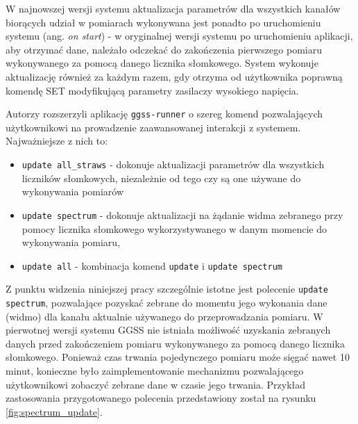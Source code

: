 W najnowszej wersji systemu aktualizacja parametrów dla wszystkich kanałów biorących udział w pomiarach wykonywana jest ponadto po uruchomieniu systemu (ang. \emph{on start}) - w oryginalnej wersji systemu po uruchomieniu aplikacji, aby otrzymać dane, należało odczekać do zakończenia pierwszego pomiaru wykonywanego za pomocą danego licznika słomkowego. System wykonuje aktualizację również za każdym razem, gdy otrzyma od użytkownika poprawną komendę SET modyfikującą parametry zasilaczy wysokiego napięcia.

Autorzy rozszerzyli aplikację \lstinline{ggss-runner} o szereg komend pozwalających użytkownikowi na prowadzenie zaawansowanej interakcji z systemem. Najważniejsze z nich to:
\begin{itemize}
\item \lstinline{update all_straws} - dokonuje aktualizacji parametrów dla wszystkich liczników słomkowych, niezależnie od tego czy są one używane do wykonywania pomiarów
\item \lstinline{update spectrum} - dokonuje aktualizacji na żądanie widma zebranego przy pomocy licznika słomkowego wykorzystywanego w danym momencie do wykonywania pomiaru, 
\item \lstinline{update all} - kombinacja komend \lstinline{update} i \lstinline{update spectrum}
\end{itemize}

Z punktu widzenia niniejszej pracy szczególnie istotne jest polecenie \lstinline{update spectrum}, pozwalające pozyskać zebrane do momentu jego wykonania dane (widmo) dla kanału aktualnie używanego do przeprowadzania pomiaru. W pierwotnej wersji systemu GGSS nie istniała możliwość uzyskania zebranych danych przed zakończeniem pomiaru wykonywanego za pomocą danego licznika słomkowego. Ponieważ czas trwania pojedynczego pomiaru może sięgać nawet 10 minut, konieczne było zaimplementowanie mechanizmu pozwalającego użytkownikowi zobaczyć zebrane dane w czasie jego trwania. Przykład zastosowania przygotowanego polecenia przedstawiony został na rysunku \ref{fig:spectrum_update}.

